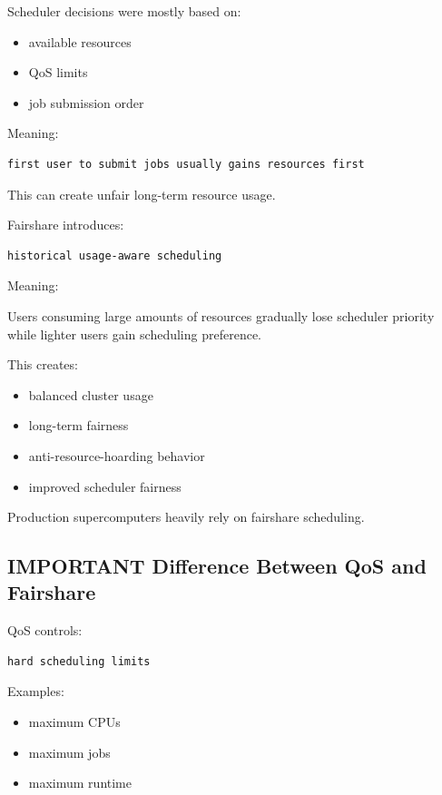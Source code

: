 \documentclass[11pt]{article}
\begin{document}
Scheduler decisions were mostly based on:

\begin{itemize}
\item available resources
\item QoS limits
\item job submission order
\end{itemize}

Meaning:

\begin{verbatim}
first user to submit jobs usually gains resources first
\end{verbatim}

This can create unfair long-term resource usage.

Fairshare introduces:

\begin{verbatim}
historical usage-aware scheduling
\end{verbatim}

Meaning:

Users consuming large amounts of resources gradually lose scheduler
priority while lighter users gain scheduling preference.

This creates:

\begin{itemize}
\item balanced cluster usage
\item long-term fairness
\item anti-resource-hoarding behavior
\item improved scheduler fairness
\end{itemize}

Production supercomputers heavily rely on fairshare scheduling.
\subsection{IMPORTANT Difference Between QoS and Fairshare}
\label{sec:org20bac77}

QoS controls:

\begin{verbatim}
hard scheduling limits
\end{verbatim}

Examples:

\begin{itemize}
\item maximum CPUs
\item maximum jobs
\item maximum runtime
\end{itemize}
\end{document}
